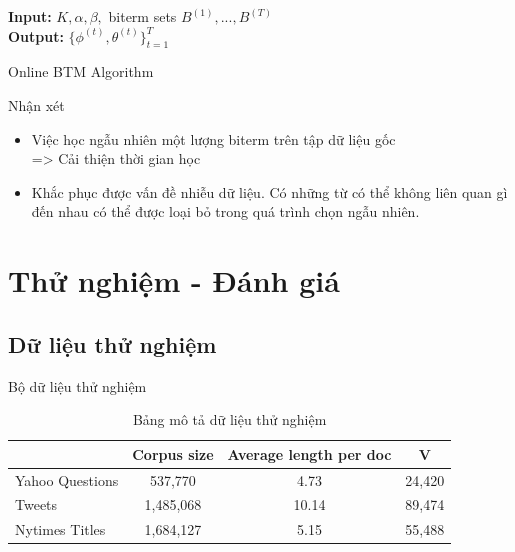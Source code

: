 \documentclass[pdf]{beamer}
\begin{document}
\begin{frame}
\begin{algorithm}[H]
	\textbf{Input: }  $K, \alpha , \beta, $ biterm sets $B^{(1)}, ..., B^{(T)}$  \\
	\textbf{Output:} $\{\phi^{(t)}, \theta^{(t)} \}_{t=1}^T$
	\begin{algorithmic}[1]
		\ENDFOR
		\ENDFOR
		\ENDFOR
	\end{algorithmic}
	\caption{Online BTM Algorithm }
	\label{alg:seq}
\end{algorithm}
\end{frame}

\begin{frame}{Nhận xét}
	\begin{itemize}
		\item Việc học ngẫu nhiên một lượng biterm trên tập dữ liệu gốc \\
		=> Cải thiện thời gian học
		\item Khắc phục được vấn đề nhiễu dữ liệu. Có những từ có thể không liên quan gì đến nhau có thể được loại bỏ trong quá trình chọn ngẫu nhiên.
	\end{itemize}
\end{frame}
\section{Thử nghiệm - Đánh giá}
\subsection{Dữ liệu thử nghiệm}
\begin{frame}{Bộ dữ liệu thử nghiệm}
\begin{table}
	\begin{tabular}{l | c | c | c }
		& Corpus size & Average length per doc & V \\
		\hline \hline
		Yahoo Questions & 537,770 & 4.73 & 24,420  \\ 
		Tweets & 1,485,068 & 10.14 & 89,474 \\
		Nytimes Titles & 1,684,127 & 5.15 & 55,488
	\end{tabular}
	\caption{Bảng mô tả dữ liệu thử nghiệm}
\end{table}
\end{frame}
\end{document}
